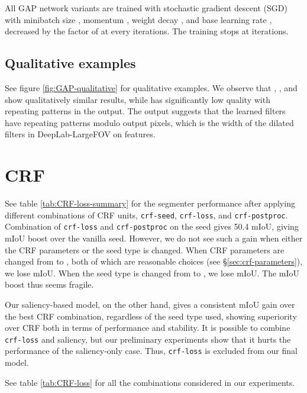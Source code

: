 \documentclass[british,10pt,twocolumn,letterpaper]{article}
\begin{document}
All GAP network variants are trained with stochastic gradient descent
(SGD) with minibatch size , momentum , weight decay ,
and base learning rate , decreased by the factor of 
at every  iterations. The training stops at  iterations.

\subsection{\label{sec:supp-gap-qual}Qualitative examples}

See figure \ref{fig:GAP-qualitative} for qualitative examples. We
observe that , ,
and  show qualitatively similar
results, while  has significantly
low quality with repeating patterns in the output. The output suggests
that the learned filters have repeating patterns modulo 
output pixels, which is the width of the dilated filters in DeepLab-LargeFOV
\cite{Chen2016ArxivDeeplabv2} on  features.

\section{\label{sec:supp-crf}CRF}

See table \ref{tab:CRF-loss-summary} for the segmenter performance
after applying different combinations of CRF units, \texttt{crf-seed},
\texttt{crf-loss}, and \texttt{crf-postproc}. Combination of \texttt{crf-loss}
and \texttt{crf-postproc} on the 
seed gives 50.4 mIoU, giving  mIoU boost over the vanilla seed.
However, we do not see such a gain when either the CRF parameters
or the seed type is changed. When CRF parameters are changed from
 to , both of which are reasonable choices (see \S\ref{sec:crf-parameters}),
we lose  mIoU. When the seed type is changed from 
to , we lose  mIoU. The 
mIoU boost thus seems fragile.

Our saliency-based model, on the other hand, gives a consistent 
mIoU gain over the best CRF combination, regardless of the seed type
used, showing superiority over CRF both in terms of performance and
stability. It is possible to combine \texttt{crf-loss} and saliency,
but our preliminary experiments show that it hurts the performance
of the saliency-only case. Thus, \texttt{crf-loss} is excluded from
our final model.

See table \ref{tab:CRF-loss} for all the combinations considered
in our experiments. 
\end{document}
